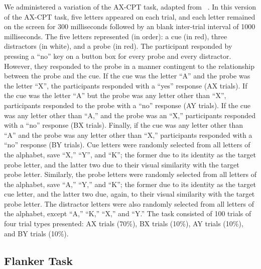 We administered a variation of the AX-CPT task, adapted from ~\citep{Ophir2009, Morales2013}. In this version of the AX-CPT task, five letters appeared on each trial, and each letter remained on the screen for 300 milliseconds followed by an blank inter-trial interval of 1000 milliseconds. The five letters represented (in order): a cue (in red), three distractors (in white), and a probe (in red). The participant responded by pressing a ``no'' key on a button box for every probe and every distractor. However, they responded to the probe in a manner contingent to the relationship between the probe and the cue. If the cue was the letter ``A'' and the probe was the letter ``X'', the participants responded with a ``yes'' response (AX trials). If the cue was the letter ``A'' but the probe was any letter other than ``X'', participants responded to the probe with a ``no'' response (AY trials). If the cue was any letter other than ``A,'' and the probe was an ``X,'' participants responded with a ``no'' response (BX trials). Finally, if the cue was any letter other than ``A'' and the probe was any letter other than ``X,'' participants responded with a ``no'' response (BY trials). Cue letters were randomly selected from all letters of the alphabet, save ``X,'' ``Y'', and ``K''; the former due to its identity as the target probe letter, and the latter two due to their visual similarity with the target probe letter. Similarly, the probe letters were randomly selected from all letters of the alphabet, save ``A,'' ``Y,'' and ``K''; the former due to its identity as the target cue letter, and the latter two due, again, to their visual similarity with the target probe letter. The distractor letters were also randomly selected from all letters of the alphabet, except ``A,'' ``K,'' ``X,'' and ``Y.'' The task consisted of 100 trials of four trial types presented: AX trials (70\%), BX trials (10\%), AY trials (10\%), and BY trials (10\%).

\subsection{Flanker Task}
\label{flankertask}


